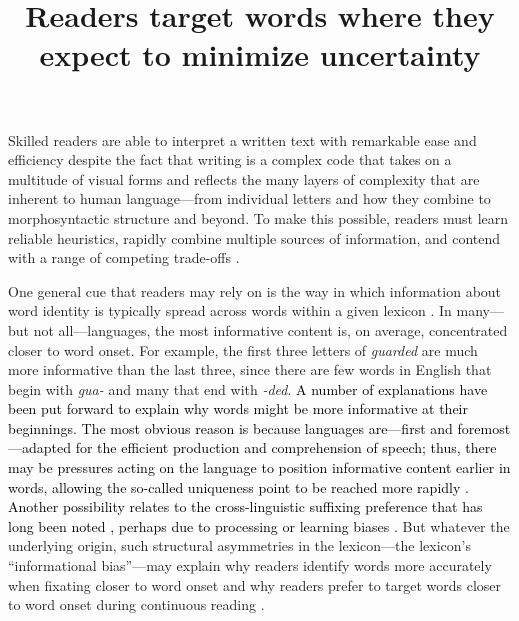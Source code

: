 \documentclass[doc,biblatex]{apa7}
\title{Readers target words where they expect to minimize uncertainty}
\newcommand\newmaterial[1]{\textcolor{black}{#1}}
\begin{document}
\maketitle

\noindent
Skilled readers are able to interpret a written text with remarkable ease and efficiency despite the fact that writing is a complex code that takes on a multitude of visual forms and reflects the many layers of complexity that are inherent to human language---from individual letters and how they combine to morphosyntactic structure and beyond. To make this possible, readers must learn reliable heuristics, rapidly combine multiple sources of information, and contend with a range of competing trade-offs \parencite{Rayner:1998, Yeatman:2021, Snowling:2022}.

One general cue that readers may rely on is the way in which information about word identity is typically spread across words within a given lexicon \parencite{Farid:1996, Clark:1999, Deutsch:1999, Alhama:2019, Shafir:2022}. In many---but not all---languages, the most informative content is, on average, concentrated closer to word onset. For example, the first three letters of \textit{guarded} are much more informative than the last three, since there are few words in English that begin with \textit{gua-} and many that end with \textit{-ded}. \newmaterial{A number of explanations have been put forward to explain why words might be more informative at their beginnings. The most obvious reason is because languages are---first and foremost---adapted for the efficient production and comprehension of speech; thus, there may be pressures acting on the language to position informative content earlier in words, allowing the so-called uniqueness point to be reached more rapidly \parencite{MarslenWilson:1987}. Another possibility relates to the cross-linguistic suffixing preference that has long been noted \parencite{Greenberg:1957}, perhaps due to processing or learning biases \parencite{Cutler:1985, Hawkins:1988, Martin:2020, Ramscar:2013, StClair:2009}.} But whatever the underlying origin, such structural asymmetries in the lexicon---the lexicon's ``informational bias''---may explain why readers identify words more accurately when fixating closer to word onset \parencite[the optimal viewing position;][]{ORegan:1984, Brysbaert:2005, Hyona:2011} and why readers prefer to target words closer to word onset during continuous reading \parencite[the preferred landing position;][]{McConkie:1988, Vitu:1990, Ducrot:2002}.
\end{document}
